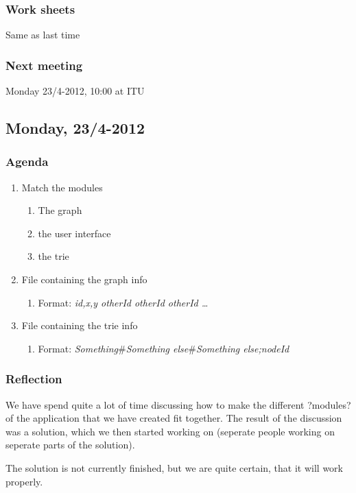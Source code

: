 \documentclass[a4paper,11pt]{article}
\begin{document}
\subsubsection*{Work sheets}
Same as last time

\subsubsection*{Next meeting}
Monday 23/4-2012, 10:00 at ITU


\pagebreak
\subsection{Monday, 23/4-2012}

\subsubsection*{Agenda}
\begin{enumerate}
	\item Match the modules
	\begin{enumerate}
		\item The graph
		\item the user interface
		\item the trie
	\end{enumerate}
	\item File containing the graph info
	\begin{enumerate}
		\item Format: \textsl{id,x,y otherId otherId otherId \ldots}
	\end{enumerate}
	\item File containing the trie info
	\begin{enumerate}
		\item Format: \textsl{Something$\#$Something else$\#$Something else;nodeId}
	\end{enumerate}
\end{enumerate}

\subsubsection*{Reflection}
We have spend quite a lot of time discussing how to make the different ?modules? of the application that we have created fit together.
The result of the discussion was a solution, which we then started working on (seperate people working on seperate parts of the solution).

The solution is not currently finished, but we are quite certain, that it will work properly.
\end{document}
